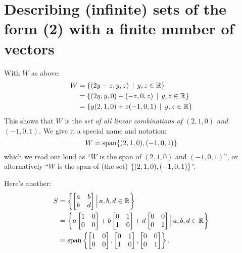 \section[Describing infinite sets with a finite number of vectors]{Describing (infinite) sets of the form (2) with a finite
number of vectors}

\begin{myexample} With $W$ as above:
\begin{align*}
W &= \{ (2y-z,y,z) \,\mid \, y,z \in \mathbb{R}\}\\
&= \{ (2y, y,0) + (-z,0, z) \,\mid \, y,z\in\mathbb{R}\}\\
&= \{ y(2,1,0) + z(-1, 0,1) \,\mid \, y,z\in \mathbb{R}\}
\end{align*}
This shows that $W$ is the \emph{set of all linear combinations of $(2,1,0)$
and $(-1,0,1)$.}  We give it a special name and notation:
$$
W = \textrm{span}\{ (2,1,0), (-1,0,1)\}
$$
which we read out loud as ``$W$ is the span of  $(2,1,0)$
and $(-1,0,1)$'',  or alternatively ``$W$ is the span of  (the set) $\{(2,1,0),(-1,0,1) \}$''.\end{myexample}

\begin{myexample} Here's another:
\begin{align*}
S &= \left\{  \left[ \begin{matrix} a & b\\ b & d \end{matrix} \right] \Big|\, a,b,d \in \mathbb{R}\right\}\\
&=  \left\{ a\left[ \begin{matrix} 1&0\\0&0 \end{matrix} \right] + b\left[ \begin{matrix} 0&1\\1&0 \end{matrix} \right] + d\left[ \begin{matrix} 0&0\\0&1 \end{matrix} \right]
 \Big|\, a,b,d \in \mathbb{R}\right\}\\
&= \textrm{span}\left\{ \left[ \begin{matrix} 1&0\\0&0 \end{matrix} \right],\left[ \begin{matrix} 0&1\\1&0 \end{matrix} \right],\left[ \begin{matrix} 0&0\\0&1 \end{matrix} \right]\right\}.
\end{align*}
\end{myexample}

